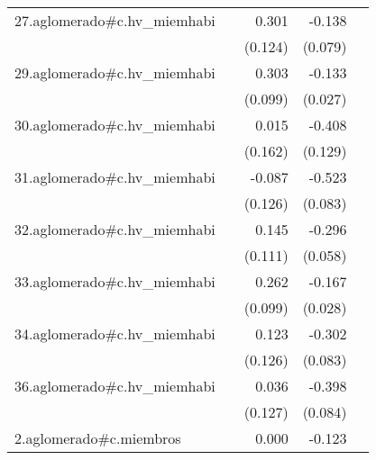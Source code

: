 {\begin{longtable}{l*{4}{D{.}{.}{-1}}}
\addlinespace
27.aglomerado#c.hv\_miemhabi&                     &       0.301\sym{*}  &      -0.138         &                     \\
            &                     &     (0.124)         &     (0.079)         &                     \\
\addlinespace
29.aglomerado#c.hv\_miemhabi&                     &       0.303\sym{**} &      -0.133\sym{***}&                     \\
            &                     &     (0.099)         &     (0.027)         &                     \\
\addlinespace
30.aglomerado#c.hv\_miemhabi&                     &       0.015         &      -0.408\sym{**} &                     \\
            &                     &     (0.162)         &     (0.129)         &                     \\
\addlinespace
31.aglomerado#c.hv\_miemhabi&                     &      -0.087         &      -0.523\sym{***}&                     \\
            &                     &     (0.126)         &     (0.083)         &                     \\
\addlinespace
32.aglomerado#c.hv\_miemhabi&                     &       0.145         &      -0.296\sym{***}&                     \\
            &                     &     (0.111)         &     (0.058)         &                     \\
\addlinespace
33.aglomerado#c.hv\_miemhabi&                     &       0.262\sym{**} &      -0.167\sym{***}&                     \\
            &                     &     (0.099)         &     (0.028)         &                     \\
\addlinespace
34.aglomerado#c.hv\_miemhabi&                     &       0.123         &      -0.302\sym{***}&                     \\
            &                     &     (0.126)         &     (0.083)         &                     \\
\addlinespace
36.aglomerado#c.hv\_miemhabi&                     &       0.036         &      -0.398\sym{***}&                     \\
            &                     &     (0.127)         &     (0.084)         &                     \\
\addlinespace
2.aglomerado#c.miembros&                     &       0.000         &      -0.123\sym{***}&                     \\

\end{longtable}}
